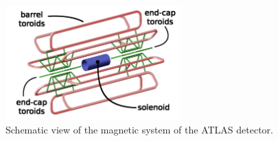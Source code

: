 \begin{figure}
\centering
\includegraphics[width=0.6\textwidth]{data/photo/detector/magnet.png}
\caption{Schematic view of the magnetic system of the ATLAS detector. \cite{magnetic_system}}
\label{fig:magnetic_system}
\end{figure}

